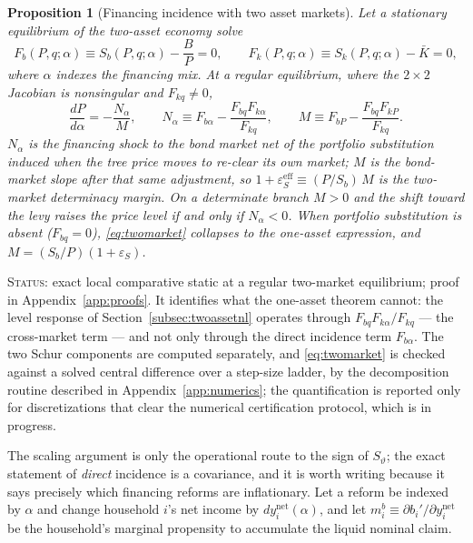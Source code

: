 \documentclass[12pt]{article}
\newtheorem{proposition}{Proposition}
\newcommand{\Sfun}{S}
\begin{document}
\begin{proposition}[Financing incidence with two asset markets]
\label{prop:twomarket}
Let a stationary equilibrium of the two-asset economy solve
\[
F_b(P,q;\alpha)\equiv \Sfun_b(P,q;\alpha)-\frac{B}{P}=0,
\qquad
F_k(P,q;\alpha)\equiv \Sfun_k(P,q;\alpha)-\bar K=0,
\]
where $\alpha$ indexes the financing mix. At a regular equilibrium, where
the $2\times2$ Jacobian is nonsingular and $F_{kq}\neq0$,
\begin{equation}
\frac{dP}{d\alpha}=-\frac{N_\alpha}{M},
\qquad
N_\alpha\equiv F_{b\alpha}-\frac{F_{bq}F_{k\alpha}}{F_{kq}},
\qquad
M\equiv F_{bP}-\frac{F_{bq}F_{kP}}{F_{kq}} .
\label{eq:twomarket}
\end{equation}
$N_\alpha$ is the financing shock to the bond market \emph{net of} the
portfolio substitution induced when the tree price moves to re-clear its own
market; $M$ is the bond-market slope after that same adjustment, so
$1+\varepsilon_{\Sfun}^{\mathrm{eff}}\equiv (P/\Sfun_b)\,M$ is the
two-market determinacy margin. On a determinate branch $M>0$ and the shift
toward the levy raises the price level if and only if $N_\alpha<0$. When
portfolio substitution is absent ($F_{bq}=0$), \eqref{eq:twomarket}
collapses to the one-asset expression, and $M=(\Sfun_b/P)(1+\varepsilon_\Sfun)$.
\end{proposition}
\noindent\textsc{Status:} exact local comparative static at a regular
two-market equilibrium; proof in Appendix~\ref{app:proofs}. It identifies
what the one-asset theorem cannot: the level response of
Section~\ref{subsec:twoassetnl} operates through $F_{bq}F_{k\alpha}/F_{kq}$
--- the cross-market term --- and not only through the direct incidence
term $F_{b\alpha}$. The two Schur components are computed separately, and
\eqref{eq:twomarket} is checked against a solved central difference over a
step-size ladder, by the decomposition routine described in
Appendix~\ref{app:numerics}; the quantification is reported only for
discretizations that clear the numerical certification protocol, which is in
progress.

The scaling argument is only the operational route to the sign of
$\Sfun_\vartheta$; the exact statement of \emph{direct} incidence is a
covariance, and it is worth writing because it says
precisely which financing reforms are inflationary. Let a reform be indexed
by $\alpha$ and change household $i$'s net income by
$dy_i^{\mathrm{net}}(\alpha)$, and let
$m_i^b\equiv \partial b_i'/\partial y_i^{\mathrm{net}}$ be the household's
marginal propensity to accumulate the liquid nominal claim.
\end{document}

